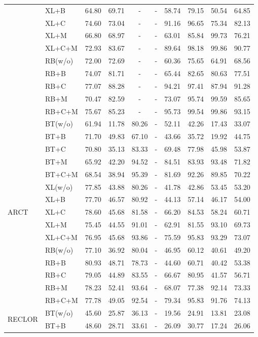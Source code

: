 \begin{table}[th]
\begin{tabular}{ll|c|ccccccc}
&XL+B&64.80 &69.71 &-&-&58.74 &79.15 &50.54 &64.85 \\ 
&XL+C&74.60 &73.04 &-&-&91.16 &96.65 &75.34 &82.13 \\ 
&XL+M&66.80 &68.97 &-&-&63.01 &85.84 &99.73 &76.21 \\ 
&XL+C+M&72.93 &83.67 &-&-&89.64 &98.18 &99.86 &90.77 \\ 
\cline{2-10}
&RB(w/o)&72.00 &72.69 &-&-&60.36 &75.65 &64.91 &68.56 \\ 
&RB+B&74.07 &81.71 &-&-&65.44 &82.65 &80.63 &77.51 \\ 
&RB+C&77.07 &88.28 &-&-&94.21 &97.41 &87.94 &91.28 \\ 
&RB+M&70.47 &82.59 &-&-&73.07 &95.74 &99.59 &85.65 \\ 
&RB+C+M&75.67 &85.23 &-&-&95.73 &99.54 &99.86 &93.15 \\ 
\hline
\multirow{15}{*}{ARCT} 
&BT(w/o)&61.94 &11.78 &80.26 &-&52.11 &42.26 &17.43 &33.07 \\ 
&BT+B&71.70 &49.83 &67.10 &-&43.66 &35.72 &19.92 &44.75 \\ 
&BT+C&70.80 &35.13 &83.33 &-&69.48 &77.98 &45.98 &53.87 \\ 
&BT+M&65.92 &42.20 &94.52 &-&84.51 &83.93 &93.48 &71.82 \\ 
&BT+C+M&68.54 &38.94 &95.39 &-&81.69 &92.26 &89.85 &70.22 \\ 
\cline{2-10}
&XL(w/o)&77.85 &43.88 &80.26 &-&41.78 &42.86 &53.45 &53.20 \\ 
&XL+B&77.70 &46.57 &80.92 &-&44.13 &57.14 &46.17 &54.00 \\ 
&XL+C&78.60 &45.68 &81.58 &-&66.20 &84.53 &58.24 &60.71 \\ 
&XL+M&75.45 &44.55 &91.01 &-&62.91 &81.55 &93.10 &69.73 \\ 
&XL+C+M&76.95 &45.68 &93.86 &-&75.59 &95.83 &93.29 &73.07 \\ 
\cline{2-10}
&RB(w/o)&77.10 &36.92 &80.04 &-&46.95 &60.12 &40.61 &49.20 \\ 
&RB+B&80.93 &48.71 &78.73 &-&44.60 &60.71 &40.42 &53.38 \\ 
&RB+C&79.05 &44.89 &83.55 &-&66.67 &80.95 &41.57 &56.71 \\ 
&RB+M&78.23 &52.41 &93.64 &-&68.07 &77.38 &92.14 &73.33 \\ 
&RB+C+M&77.78 &49.05 &92.54 &-&79.34 &95.83 &91.76 &74.13 \\ 
\hline
\multirow{15}{*}{RECLOR} 
&BT(w/o)&45.60 &25.87 &36.13 &-&19.56 &24.91 &13.81 &23.08\\ 
&BT+B&48.60 &28.71 &33.61 &-&26.09 &30.77 &17.24 &26.06\\ 

\end{tabular}
\end{table}
